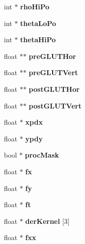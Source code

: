 \begin{DoxyCompactItemize}
\item 
int $\ast$ {\bfseries rho\+Hi\+Po}\label{classoFlow_a531f78bdbefc7ea7375686a0930b6fae}

\item 
int $\ast$ {\bfseries theta\+Lo\+Po}\label{classoFlow_aed1f41bb9df7b3b616a1b3938923f127}

\item 
int $\ast$ {\bfseries theta\+Hi\+Po}\label{classoFlow_abed75790db35b94fcf6839bf1e8d83d9}

\item 
float $\ast$$\ast$ {\bfseries pre\+G\+L\+U\+T\+Hor}\label{classoFlow_aee05787c00362166615e8f5f6fc9dfa2}

\item 
float $\ast$$\ast$ {\bfseries pre\+G\+L\+U\+T\+Vert}\label{classoFlow_a4106c2f1d1254164e375983db48650e6}

\item 
float $\ast$$\ast$ {\bfseries post\+G\+L\+U\+T\+Hor}\label{classoFlow_a5704c4f14b19c04859e155793f3fdc9f}

\item 
float $\ast$$\ast$ {\bfseries post\+G\+L\+U\+T\+Vert}\label{classoFlow_a197a7e67132a5dab3ea89cff87b7c0ab}

\item 
float $\ast$ {\bfseries xpdx}\label{classoFlow_a015611aeb004a79a8ff0b068db3073ec}

\item 
float $\ast$ {\bfseries ypdy}\label{classoFlow_a7cd59d09d2222f5db7912349216bd8f7}

\item 
bool $\ast$ {\bfseries proc\+Mask}\label{classoFlow_a5ede908c5a109cd5b78604cd141f705d}

\item 
float $\ast$ {\bfseries fx}\label{classoFlow_a737cb210637d023ed4c60eb2c876966d}

\item 
float $\ast$ {\bfseries fy}\label{classoFlow_a041801441aa8655fb1041c274ffdcec7}

\item 
float $\ast$ {\bfseries ft}\label{classoFlow_affc57818251eeac165968b31ef066056}

\item 
float $\ast$ {\bfseries der\+Kernel} \mbox{[}3\mbox{]}\label{classoFlow_a5252eac18513b23360c9b1e5be7dacc9}

\item 
float $\ast$ {\bfseries fxx}\label{classoFlow_a8a1215c5403b31c3c3d6d196470b660f}


\end{DoxyCompactItemize}
